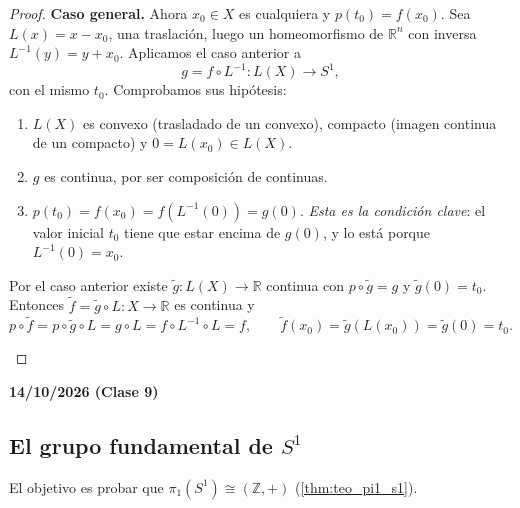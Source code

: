 \begin{proof}
\textbf{Caso general.} Ahora $x_0 \in X$ es cualquiera y $p(t_0) = f(x_0)$. Sea $L(x) = x - x_0$, una traslación, luego un homeomorfismo de $\mathbb{R}^n$ con inversa $L^{-1}(y) = y + x_0$. Aplicamos el caso anterior a
\[ g = f \circ L^{-1} \colon L(X) \to S^1, \]
con el mismo $t_0$. Comprobamos sus hipótesis:
\begin{enumerate}
    \item[(H1)] $L(X)$ es convexo (trasladado de un convexo), compacto (imagen continua de un compacto) y $0 = L(x_0) \in L(X)$.
    \item[(H2)] $g$ es continua, por ser composición de continuas.
    \item[(H3)] $p(t_0) = f(x_0) = f(L^{-1}(0)) = g(0)$. \emph{Esta es la condición clave}: el valor inicial $t_0$ tiene que estar encima de $g(0)$, y lo está porque $L^{-1}(0) = x_0$.
\end{enumerate}
Por el caso anterior existe $\tilde g \colon L(X) \to \mathbb{R}$ continua con $p \circ \tilde g = g$ y $\tilde g(0) = t_0$. Entonces $\tilde f = \tilde g \circ L \colon X \to \mathbb{R}$ es continua y
\[ p \circ \tilde f = p \circ \tilde g \circ L = g \circ L = f \circ L^{-1} \circ L = f, \qquad \tilde f(x_0) = \tilde g(L(x_0)) = \tilde g(0) = t_0. \]
\begin{center}
\end{center}
\end{proof}
\begin{center}
    \textbf{14/10/2026 (Clase 9)}
\end{center}

\subsection{El grupo fundamental de $S^1$}

El objetivo es probar que $\pi_1(S^1) \cong (\mathbb{Z},+)$ (\cref{thm:teo_pi1_s1}).

